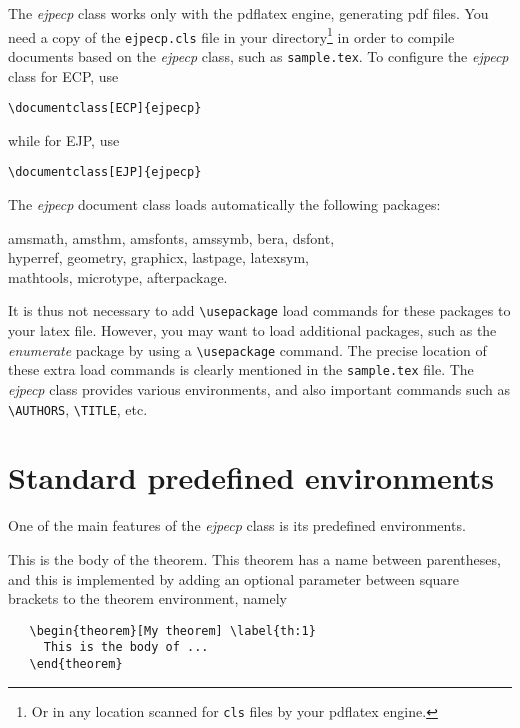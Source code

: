\documentclass[ECP]{ejpecp} %
\begin{document}
The \emph{ejpecp} class works only with the pdflatex engine, generating pdf
files. You need a copy of the \texttt{ejpecp.cls} file in your
directory\footnote{Or in any location scanned for \texttt{cls} files by your
  pdflatex engine.} in order to compile documents based on the \emph{ejpecp}
class, such as \texttt{sample.tex}. To configure the \emph{ejpecp} class for
ECP, use
\begin{verbatim}
\documentclass[ECP]{ejpecp}
\end{verbatim}
while for EJP, use
\begin{verbatim}
\documentclass[EJP]{ejpecp}
\end{verbatim}
The \emph{ejpecp} document class loads automatically the following packages:
\begin{center}
  \ttfamily
  amsmath, amsthm, amsfonts, amssymb, bera, dsfont, \\
  hyperref, geometry, graphicx, lastpage, latexsym, \\
  mathtools, microtype, afterpackage.
\end{center}
It is thus not necessary to add \verb+\usepackage+ load commands for
these packages to your latex file. However, you may want to load additional
packages, such as the \emph{enumerate} package by using a \verb+\usepackage+
command. The precise location of these extra load commands is clearly
mentioned in the \texttt{sample.tex} file. The \emph{ejpecp} class provides
various environments, and also important commands such as \verb+\AUTHORS+,
\verb+\TITLE+, etc.

\section{Standard predefined environments}

One of the main features of the \emph{ejpecp} class is its predefined
environments.

 \begin{theorem}[My theorem]\label{th:1}
   This is the body of the theorem. This theorem has a name between
   parentheses, and this is implemented by adding an optional parameter
   between square brackets to the theorem environment, namely
\begin{verbatim}
   \begin{theorem}[My theorem] \label{th:1}
     This is the body of ...
   \end{theorem}
\end{verbatim}
 \end{theorem}
\end{document}
